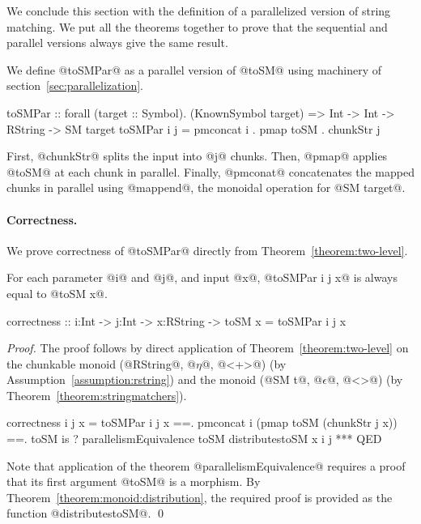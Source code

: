 We conclude this section with
the definition of a parallelized version of string matching.
%
We put all the theorems together to prove 
that the sequential and parallel versions always give the same result.

We define @toSMPar@ as a parallel version of @toSM@ using machinery of section~\ref{sec:parallelization}.
\begin{code}
toSMPar :: forall (target :: Symbol). (KnownSymbol target)
        => Int -> Int -> RString -> SM target
toSMPar i j = pmconcat i . pmap toSM . chunkStr j
\end{code}
%
First, @chunkStr@ splits the input into @j@ chunks.
%
Then, @pmap@ applies @toSM@ at each chunk in parallel.
Finally, @pmconat@ concatenates the mapped chunks in parallel
using @mappend@, the monoidal operation for @SM target@.

\paragraph{Correctness.}
We prove correctness of @toSMPar@ directly from
Theorem~\ref{theorem:two-level}.
\begin{theorem}\label{theorem:correctness}
For each parameter @i@ and @j@, and input @x@,
@toSMPar i j x@ is always equal to @toSM x@.
\begin{code}
correctness :: i:Int -> j:Int -> x:RString
             -> {toSM x = toSMPar i j x}
\end{code}
\end{theorem}

\begin{proof}
The proof follows by direct application of Theorem~\ref{theorem:two-level}
on the chunkable monoid (@RString@, @$\eta$@, @<+>@) (by Assumption~\ref{assumption:rstring})
and the monoid (@SM t@, @$\epsilon$@, @<>@) (by Theorem~\ref{theorem:stringmatchers}).
%
\begin{code}
correctness i j x
  =   toSMPar i j x
  ==. pmconcat i (pmap toSM (chunkStr j x))
  ==. toSM is
    ? parallelismEquivalence toSM distributestoSM x i j
  *** QED
\end{code}
%
Note that application of the theorem @parallelismEquivalence@
requires a proof that its first argument @toSM@ is a morphism.
%
By Theorem~\ref{theorem:monoid:distribution},
the required proof is provided as the function @distributestoSM@.
\qed\end{proof}

